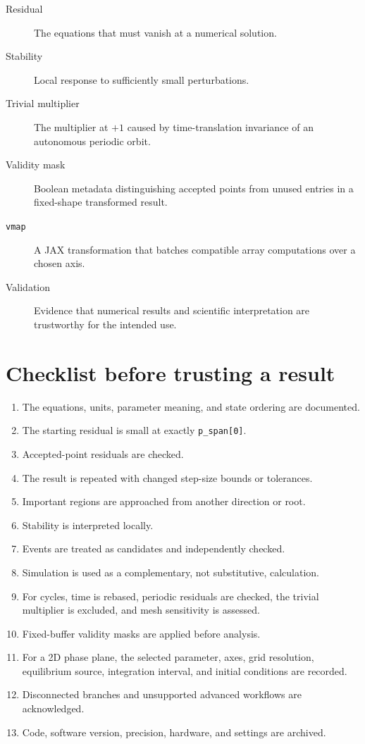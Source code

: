 \documentclass[11pt,oneside]{book}
\begin{document}
\begin{description}
  \item[Residual] The equations that must vanish at a numerical solution.
  \item[Stability] Local response to sufficiently small perturbations.
  \item[Trivial multiplier] The multiplier at $+1$ caused by time-translation
        invariance of an autonomous periodic orbit.
  \item[Validity mask] Boolean metadata distinguishing accepted points from
        unused entries in a fixed-shape transformed result.
  \item[\texttt{vmap}] A JAX transformation that batches compatible array
        computations over a chosen axis.
  \item[Validation] Evidence that numerical results and scientific
        interpretation are trustworthy for the intended use.
\end{description}

\chapter{Checklist before trusting a result}

\begin{enumerate}
  \item The equations, units, parameter meaning, and state ordering are documented.
  \item The starting residual is small at exactly \texttt{p\_span[0]}.
  \item Accepted-point residuals are checked.
  \item The result is repeated with changed step-size bounds or tolerances.
  \item Important regions are approached from another direction or root.
  \item Stability is interpreted locally.
  \item Events are treated as candidates and independently checked.
  \item Simulation is used as a complementary, not substitutive, calculation.
  \item For cycles, time is rebased, periodic residuals are checked, the
        trivial multiplier is excluded, and mesh sensitivity is assessed.
  \item Fixed-buffer validity masks are applied before analysis.
  \item For a 2D phase plane, the selected parameter, axes, grid resolution,
        equilibrium source, integration interval, and initial conditions are
        recorded.
  \item Disconnected branches and unsupported advanced workflows are acknowledged.
  \item Code, software version, precision, hardware, and settings are archived.
\end{enumerate}
\end{document}
